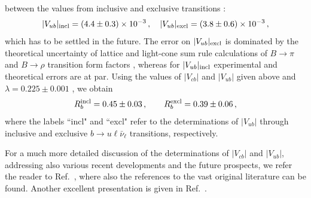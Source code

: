 \documentclass[11pt]{cernrep}
\begin{document}
between the values from inclusive and exclusive transitions \cite{HFAG}:
\begin{equation}
|V_{ub}|_{\rm incl} = (4.4\pm 0.3)\times 10^{-3}\,,\quad 
|V_{ub}|_{\rm excl} = (3.8\pm 0.6)\times 10^{-3}\,,
\end{equation}
which has to be settled in the future. 
The error on $|V_{ub}|_{\rm excl}$ is dominated by the theoretical
uncertainty of lattice and light-cone sum rule calculations of $B\to\pi$ and
$B\to\rho$ transition form factors \cite{Vublatt,LCSR}, whereas for
$|V_{ub}|_{\rm incl}$ experimental and theoretical errors are at par.
Using the values of $|V_{cb}|$ and $|V_{ub}|$ given above
and $\lambda =0.225\pm0.001$ \cite{blucher}, we obtain
\begin{equation}\label{Rb}
R_b^{\rm incl} = 0.45\pm 0.03\,,\qquad R_b^{\rm excl} = 0.39\pm
0.06\,,
\end{equation}
where the labels ``incl" and ``excl" refer to the determinations of $|V_{ub}|$
through inclusive and exclusive $b\to u\ell\bar \nu_\ell$ transitions, 
respectively. 


For a much more detailed discussion of the determinations of $|V_{cb}|$ 
and $|V_{ub}|$, addressing also various recent developments 
and the future prospects, we refer the reader to Ref.~\cite{CKM-book}, where 
also the references to the vast original literature can be found. Another 
excellent presentation is given in Ref.~\cite{BaBar-book}.
\end{document}
